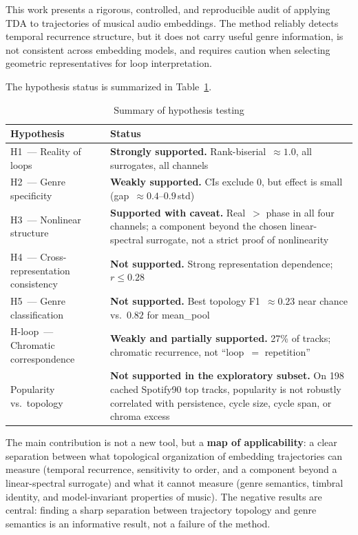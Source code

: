 This work presents a rigorous, controlled, and reproducible audit of applying TDA to trajectories of musical audio embeddings. The method reliably detects temporal recurrence structure, but it does not carry useful genre information, is not consistent across embedding models, and requires caution when selecting geometric representatives for loop interpretation.

The hypothesis status is summarized in Table~\ref{tab:conclusion}.

\begin{table}[htbp]
\caption{Summary of hypothesis testing}\label{tab:conclusion}
\centering
\begin{tabular}{lp{9cm}}
\toprule
Hypothesis & Status \\
\midrule
H1~--- Reality of loops & \textbf{Strongly supported.} Rank-biserial~$\approx 1.0$, all surrogates, all channels \\
H2~--- Genre specificity & \textbf{Weakly supported.} CIs exclude 0, but effect is small (gap~$\approx 0.4$--$0.9$\,std) \\
H3~--- Nonlinear structure & \textbf{Supported with caveat.} Real~$>$ phase in all four channels; a component beyond the chosen linear-spectral surrogate, not a strict proof of nonlinearity \\
H4~--- Cross-representation consistency & \textbf{Not supported.} Strong representation dependence; $r\le0.28$ \\
H5~--- Genre classification & \textbf{Not supported.} Best topology F1~$\approx 0.23$ near chance vs.\ $0.82$ for mean\_pool \\
H-loop~--- Chromatic correspondence & \textbf{Weakly and partially supported.} 27\% of tracks; chromatic recurrence, not ``loop~$=$ repetition'' \\
Popularity vs.\ topology & \textbf{Not supported in the exploratory subset.} On 198 cached Spotify90 top tracks, popularity is not robustly correlated with persistence, cycle size, cycle span, or chroma excess \\
\bottomrule
\end{tabular}
\end{table}

The main contribution is not a new tool, but a \textbf{map of applicability}: a clear separation between what topological organization of embedding trajectories can measure (temporal recurrence, sensitivity to order, and a component beyond a linear-spectral surrogate) and what it cannot measure (genre semantics, timbral identity, and model-invariant properties of music). The negative results are central: finding a sharp separation between trajectory topology and genre semantics is an informative result, not a failure of the method.
